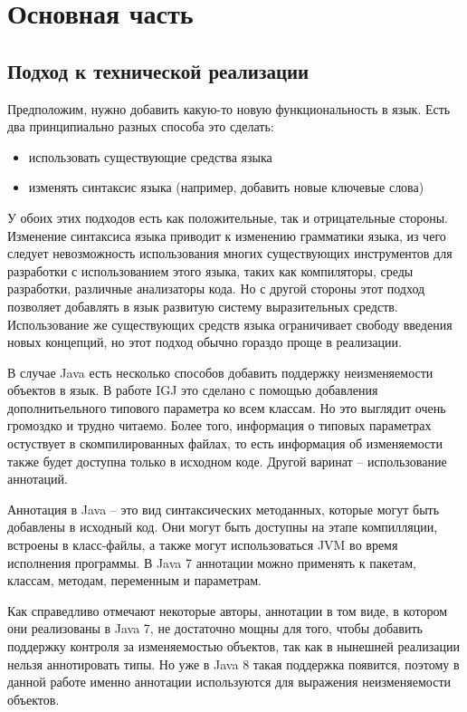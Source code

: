 \chapter{Основная часть}

\section{Подход к технической реализации}

Предположим, нужно добавить какую-то новую функциональность в язык. Есть два принципиально разных способа это сделать:
\begin{itemize}
	\item использовать существующие средства языка
	\item изменять синтаксис языка (например, добавить новые ключевые слова)
\end{itemize}

У обоих этих подходов есть как положительные, так и отрицательные стороны. Изменение синтаксиса языка приводит к изменению грамматики языка, из чего следует невозможность использования многих существующих инструментов для разработки с использованием этого языка, таких как компиляторы, среды разработки, различные анализаторы кода. Но с другой стороны этот подход позволяет добавлять в язык развитую систему выразительных средств. Использование же существующих средств языка ограничивает свободу введения новых концепций, но этот подход обычно гораздо проще в реализации.

В случае Java есть несколько способов добавить поддержку неизменяемости объектов в язык. В работе IGJ это сделано с помощью добавления дополнитьельного типового параметра ко всем классам. Но это выглядит очень громоздко и трудно читаемо. Более того, информация о типовых параметрах остуствует в скомпилированных файлах, то есть информация об изменяемости также будет доступна только в исходном коде. Другой варинат -- использование аннотаций. 

Аннотация в Java -- это вид синтаксических методанных, которые могут быть добавлены в исходный код. Они могут быть доступны на этапе компилляции, встроены в класс-файлы, а также могут использоваться JVM во время исполнения программы. В Java 7 аннотации можно применять к пакетам, классам, методам, переменным и параметрам. 

Как справедливо отмечают некоторые авторы, аннотации в том виде, в котором они реализованы в Java 7, не достаточно мощны для того, чтобы добавить поддержку контроля за изменяемостью объектов, так как в нынешней реализации нельзя аннотировать типы. Но уже в Java 8 такая поддержка появится, поэтому в данной работе именно аннотации используются для выражения неизменяемости объектов.

